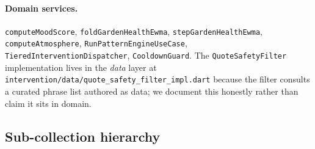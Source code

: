 \documentclass[11pt,a4paper]{article}
\begin{document}
\paragraph{Domain services.} \texttt{computeMoodScore},
\texttt{foldGardenHealthEwma}, \texttt{stepGardenHealthEwma},
\texttt{computeAtmosphere}, \texttt{RunPatternEngineUseCase},
\texttt{TieredInterventionDispatcher}, \texttt{CooldownGuard}. The
\texttt{QuoteSafetyFilter} implementation lives in the \emph{data}
layer at
\texttt{intervention/data/quote\_safety\_filter\_impl.dart} because
the filter consults a curated phrase list authored as data; we
document this honestly rather than claim it sits in domain.

\subsection{Sub-collection hierarchy}
\end{document}
